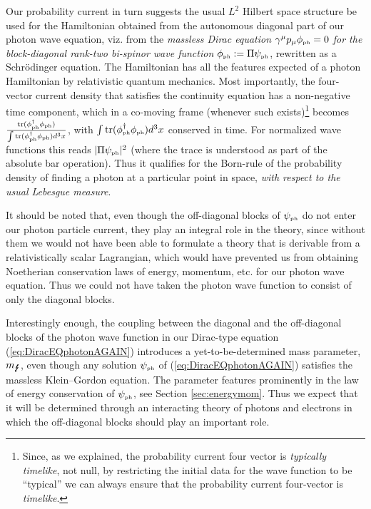 \documentclass[12pt]{article}
\theoremstyle{definition}
\DeclareMathOperator{\tr}{tr}
\newcommand{\refeq}[1]{(\ref{#1})}
\numberwithin{equation}{section}
\newcommand{\psiPH}{{\psi_{\mbox{\rm\tiny ph}}}}
\newcommand{\phiPH}{{\phi_{\mbox{\rm\tiny ph}}}}
\newcommand{\mPH}{{m_{\mbox{\Lightning}}}}
\newcommand{\ga}{\gamma}
\begin{document}
 Our probability current in turn suggests the usual $L^2$ Hilbert space structure be used for the Hamiltonian obtained from the
autonomous diagonal part of our photon wave equation, viz. from the
\emph{massless Dirac equation $\ga^\mu p_\mu \phiPH = 0$ for the block-diagonal rank-two bi-spinor wave function} $\phiPH:= \Pi\psiPH$,
rewritten as a Schr\"odinger equation.
 The Hamiltonian has all the features expected of a photon Hamiltonian by relativistic quantum mechanics.
 Most importantly, the four-vector current density that satisfies the continuity equation has a non-negative time component,
which in a co-moving frame (whenever such exists)\footnote{Since, as we explained,
  the probability current four vector is \emph{typically timelike}, not null, by restricting the initial data for the 
  wave function to be ``typical'' we can always ensure that  the probability current four-vector is \emph{timelike}.}
becomes $\frac{\tr({\phi^\dagger_{\mbox{\rm\tiny ph}}} \phiPH)}{\int \tr({\phi^\dagger_{\mbox{\rm\tiny ph}}} \phiPH) d^3x}$, 
with $\int \tr({\phi^\dagger_{\mbox{\rm\tiny ph}}} \phiPH) d^3x$ conserved in time. 
 For normalized wave functions this reads $|\Pi\psiPH|^2$ (where the trace is understood as part of the absolute bar operation).
 Thus it qualifies for the Born-rule of the probability density of finding a photon at a particular point in space,
\emph{with respect to the usual Lebesgue measure}.

 It should be noted that, even though the off-diagonal blocks of $\psiPH$ do not enter our photon particle current, 
they play an integral role in the theory, since without them we would not have been able to formulate a theory that 
is derivable from a relativistically scalar Lagrangian, which would have prevented us from obtaining Noetherian 
conservation laws of energy, momentum, etc. for our photon wave equation. 
 Thus we could not have taken the photon wave function to consist of only the diagonal blocks. 

 Interestingly enough, the coupling between the diagonal and the off-diagonal blocks of the photon wave function
in our Dirac-type equation \refeq{eq:DiracEQphotonAGAIN} introduces a yet-to-be-determined mass parameter, $\mPH$, 
even though any solution $\psiPH$ of \refeq{eq:DiracEQphotonAGAIN} satisfies the massless Klein--Gordon equation. 
 The parameter features prominently in the law of energy conservation of $\psiPH$, see Section \ref{sec:energymom}. 
 Thus we expect that it will be determined through an interacting theory of photons and electrons in which the
off-diagonal blocks should play an important role.
\end{document}
